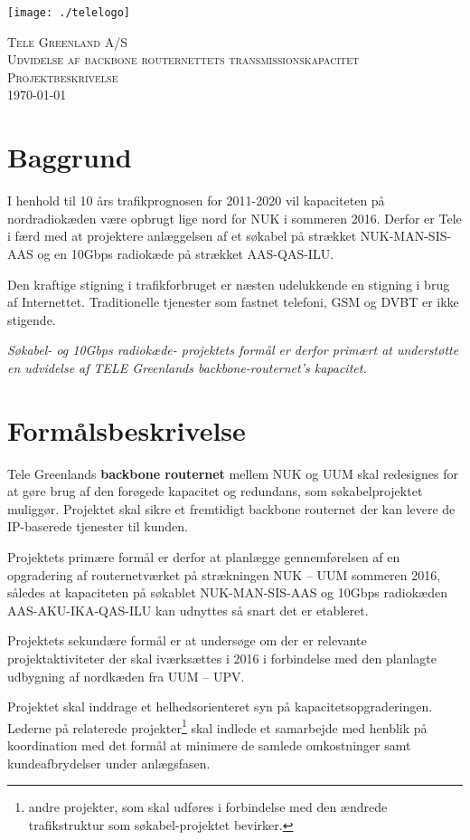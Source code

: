 \documentclass[11pt,a4paper]{article}
\begin{document}
\begin{flushright}
\texttt{[image: ./telelogo]}~\\[1cm] %
\end{flushright}
\begin{center}
\textsc{\LARGE Tele Greenland A/S}\\[1cm]
\textsc{\huge Udvidelse af backbone routernettets transmissionskapacitet} \\ [1cm]
\textsc{\Large Projektbeskrivelse}\\[0.5cm]
{\large \today} %
\end{center}

\tableofcontents

\section{Baggrund}
I henhold til 10 års trafikprognosen for 2011-2020 vil kapaciteten på nordradiokæden være opbrugt lige nord for NUK i sommeren 2016. Derfor er Tele i færd med at projektere anlæggelsen af et søkabel på strækket NUK-MAN-SIS-AAS og en 10Gbps radiokæde på strækket AAS-QAS-ILU.
\par
Den kraftige stigning i trafikforbruget er næsten udelukkende en stigning i brug af Internettet. Traditionelle tjenester som fastnet telefoni, GSM og DVBT er ikke stigende.
\par
{\em Søkabel- og 10Gbps radiokæde- projektets formål er derfor primært at understøtte en udvidelse af TELE Greenlands backbone-routernet's kapacitet.}
\section{Formålsbeskrivelse}
Tele Greenlands \textbf{backbone routernet} mellem NUK og UUM skal redesignes for at gøre brug af den forøgede kapacitet og redundans, som  søkabelprojektet muliggør. Projektet skal sikre et fremtidigt backbone routernet der kan levere de IP-baserede tjenester til kunden. 
\par
Projektets primære formål er derfor at planlægge gennemførelsen af en opgradering af routernetværket på strækningen NUK – UUM sommeren 2016, således at kapaciteten på søkablet NUK-MAN-SIS-AAS og 10Gbps radiokæden AAS-AKU-IKA-QAS-ILU kan udnyttes så snart det er etableret.
\par
Projektets sekundære formål er at undersøge om der er relevante projektaktiviteter der skal iværksættes i 2016 i forbindelse med den planlagte udbygning af nordkæden fra UUM – UPV.
\par
Projektet skal inddrage et helhedsorienteret syn på kapacitetsopgraderingen. Lederne på relaterede projekter\footnote{andre projekter, som skal udføres i forbindelse med den ændrede trafikstruktur som søkabel-projektet bevirker.} skal indlede et samarbejde med henblik på koordination med det formål at minimere de samlede omkostninger samt kundeafbrydelser under anlægsfasen.
\end{document}
